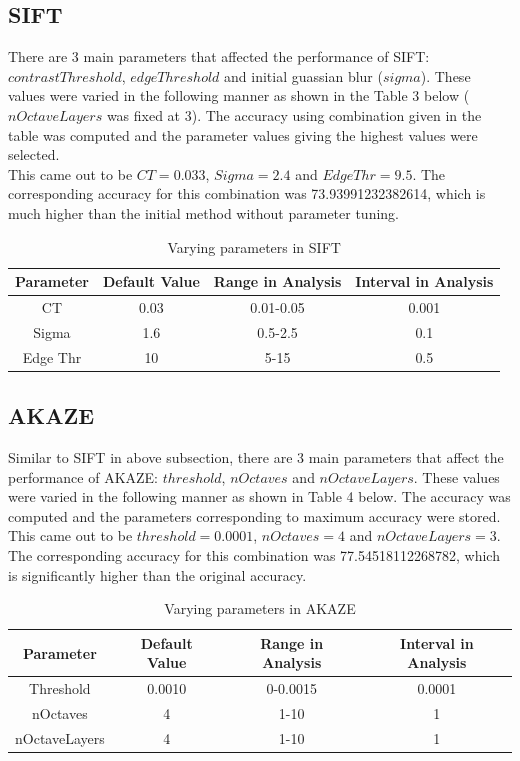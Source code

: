 \documentclass{article}
\begin{document}
\subsection{SIFT}
There are 3 main parameters that affected the performance of SIFT: $contrastThreshold$, $edgeThreshold$ and initial guassian blur ($sigma$). These values were varied in the following manner as shown in the Table 3 below ($nOctaveLayers$ was fixed at 3). The accuracy using combination given in the table was computed and the parameter values giving the highest values were selected.\\ 
This came out to be $CT=0.033$, $Sigma=2.4$ and $Edge Thr=9.5$. The corresponding accuracy for this combination was 73.93991232382614, which is much higher than the initial method without parameter tuning.
\begin{table}[htb]
\centering
\begin{tabular}{|c|c|c|c|}
\hline
Parameter & Default Value & Range in Analysis & Interval in Analysis \\ \hline
CT        & 0.03          & 0.01-0.05         & 0.001                 \\ \hline
Sigma     & 1.6           & 0.5-2.5           & 0.1                  \\ \hline
Edge Thr  & 10            & 5-15              & 0.5                  \\ \hline
\end{tabular}
\caption{Varying parameters in SIFT}
\end{table} 

\subsection{AKAZE}
Similar to SIFT in above subsection, there are 3 main parameters that affect the performance of AKAZE: $threshold$, $nOctaves$ and $nOctaveLayers$. These values were varied in the following manner as shown in Table 4 below. The accuracy was computed and the parameters corresponding to maximum accuracy were stored. \\
This came out to be $threshold=0.0001$, $nOctaves=4$ and $nOctaveLayers=3$. The corresponding accuracy for this combination was 77.54518112268782, which is significantly higher than the original accuracy.
\begin{table}[htb]
\centering
\begin{tabular}{|c|c|c|c|}
\hline
Parameter     & Default Value & Range in Analysis & Interval in Analysis \\ \hline
Threshold     & 0.0010        & 0-0.0015          & 0.0001               \\ \hline
nOctaves      & 4             & 1-10              & 1                    \\ \hline
nOctaveLayers & 4             & 1-10              & 1                    \\ \hline
\end{tabular}
\caption{Varying parameters in AKAZE}
\end{table}  
\end{document}
